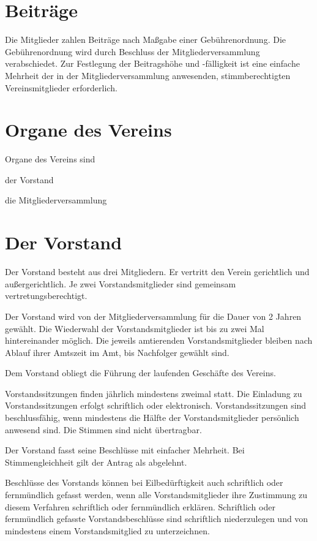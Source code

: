 \documentclass[a5paper, ngerman, 10pt]{scrreprt}
\begin{document}
\section{Beiträge}
Die Mitglieder zahlen Beiträge nach Maßgabe einer Gebührenordnung. Die
Gebührenordnung wird durch Beschluss der Mitgliederversammlung verabschiedet.
Zur Festlegung der Beitragshöhe und -fälligkeit ist eine einfache Mehrheit der
in der Mitgliederversammlung anwesenden, stimmberechtigten Vereinsmitglieder
erforderlich.


\section{Organe des Vereins}
Organe des Vereins sind
\begin{compactenum}[a.]
    \item der Vorstand
    \item die Mitgliederversammlung
\end{compactenum}


\section{Der Vorstand}
\begin{compactenum}[(1)]
    \item Der Vorstand besteht aus drei Mitgliedern. Er vertritt den Verein
        gerichtlich und außergerichtlich. Je zwei Vorstandsmitglieder sind
        gemeinsam vertretungsberechtigt.
    \item Der Vorstand wird von der Mitgliederversammlung für die Dauer von 2
        Jahren gewählt. Die Wiederwahl der Vorstandsmitglieder ist bis zu zwei
        Mal hintereinander möglich. Die jeweils amtierenden Vorstandsmitglieder
        bleiben nach Ablauf ihrer Amtszeit im Amt, bis Nachfolger gewählt sind.
    \item Dem Vorstand obliegt die Führung der laufenden Geschäfte des Vereins.
    \item Vorstandssitzungen finden jährlich mindestens zweimal statt. Die
        Einladung zu Vorstandssitzungen erfolgt schriftlich oder elektronisch.
        Vorstandssitzungen sind beschlussfähig, wenn mindestens die Hälfte der
        Vorstandsmitglieder persönlich anwesend sind. Die Stimmen sind nicht
        übertragbar.
    \item Der Vorstand fasst seine Beschlüsse mit einfacher Mehrheit. Bei
        Stimmengleichheit gilt der Antrag als abgelehnt.
    \item Beschlüsse des Vorstands können bei Eilbedürftigkeit auch schriftlich
        oder fernmündlich gefasst werden, wenn alle Vorstandsmitglieder ihre
        Zustimmung zu diesem Verfahren schriftlich oder fernmündlich erklären.
        Schriftlich oder fernmündlich gefasste Vorstandsbeschlüsse sind
        schriftlich niederzulegen und von mindestens einem Vorstandsmitglied zu
        unterzeichnen.
\end{compactenum}
\end{document}
